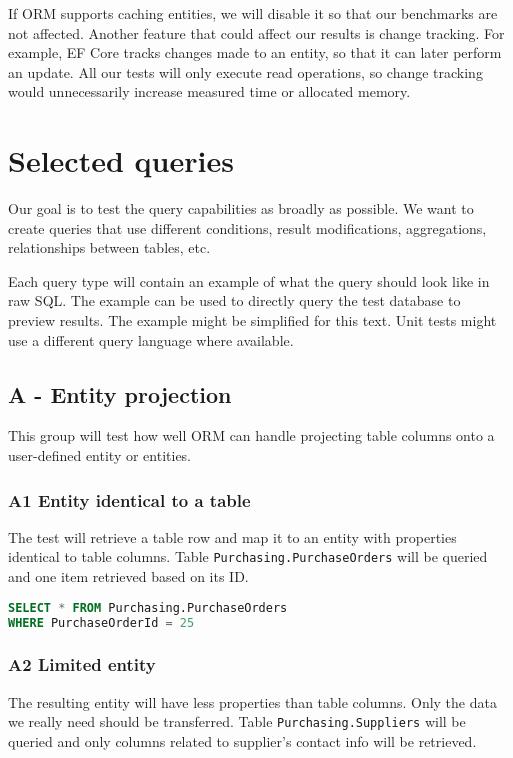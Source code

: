 If ORM supports caching entities, we will disable it so that our benchmarks are not affected. 
Another feature that could affect our results is change tracking. 
For example, EF Core tracks changes made to an entity, so that it can later perform an update. All our tests will only execute read operations, so change tracking would unnecessarily increase measured time or allocated memory.


\section{Selected queries}\label{sec:selected_queries}
Our goal is to test the query capabilities as broadly as possible. We want to create queries that use different conditions, result modifications, aggregations, relationships between tables, etc.

Each query type will contain an example of what the query should look like in raw SQL. The example can be used to directly query the test database to preview results. The example might be simplified for this text. Unit tests might use a different query language where available.

\subsection{A - Entity projection}
This group will test how well ORM can handle projecting table columns onto a user-defined entity or entities.

\subsubsection*{A1 Entity identical to a table} \label{query:a1}
The test will retrieve a table row and map it to an entity with properties identical to table columns. 
Table \texttt{Purchasing.PurchaseOrders} will be queried and one item retrieved based on its ID.

\begin{lstlisting}[language=SQL]
SELECT * FROM Purchasing.PurchaseOrders 
WHERE PurchaseOrderId = 25
\end{lstlisting}

\subsubsection*{A2 Limited entity}
The resulting entity will have less properties than table columns. Only the data we really need should be transferred. 
Table \texttt{Purchasing.Suppliers} will be queried and only columns related to supplier's contact info will be retrieved.

